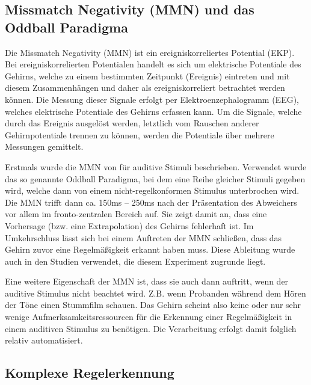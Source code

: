 \documentclass[doc,a4paper,12pt]{apa6}
\begin{document}
\subsection{Missmatch Negativity (MMN) und das Oddball Paradigma}

Die Missmatch Negativity (MMN) ist ein ereigniskorreliertes Potential (EKP). Bei ereigniskorrelierten Potentialen handelt es sich um elektrische Potentiale des Gehirns, welche zu einem bestimmten Zeitpunkt (Ereignis) eintreten und mit diesem Zusammenhängen und daher als ereigniskorreliert betrachtet werden können. Die Messung dieser Signale erfolgt per Elektroenzephalogramm (EEG), welches elektrische Potentiale des Gehirns erfassen kann. Um die Signale, welche durch das Ereignis ausgelöst werden, letztlich vom Rauschen anderer Gehirnpotentiale trennen zu können, werden die Potentiale über mehrere Messungen gemittelt.

Erstmals wurde die MMN von \textcite{naatanen1978early} für auditive Stimuli beschrieben. Verwendet wurde das so genannte Oddball Paradigma, bei dem eine Reihe gleicher Stimuli gegeben wird, welche dann von einem nicht-regelkonformen Stimulus unterbrochen wird. Die MMN trifft dann ca. 150ms – 250ms nach der Präsentation des Abweichers vor allem im fronto-zentralen Bereich auf. Sie zeigt damit an, dass eine Vorhersage (bzw. eine Extrapolation) des Gehirns fehlerhaft ist. Im Umkehrschluss lässt sich bei einem Auftreten der MMN schließen, dass das Gehirn zuvor eine Regelmäßigkeit erkannt haben muss. Diese Ableitung wurde auch in den Studien verwendet, die diesem Experiment zugrunde liegt.

Eine weitere Eigenschaft der MMN ist, dass sie auch dann auftritt, wenn der auditive Stimulus nicht beachtet wird. Z.B. wenn Probanden während dem Hören der Töne einen Stummfilm schauen. Das Gehirn scheint also keine oder nur sehr wenige Aufmerksamkeitsressourcen für die Erkennung einer Regelmäßigkeit in einem auditiven Stimulus zu benötigen. Die Verarbeitung erfolgt damit folglich relativ automatisiert.

\subsection{Komplexe Regelerkennung}

\end{document}

